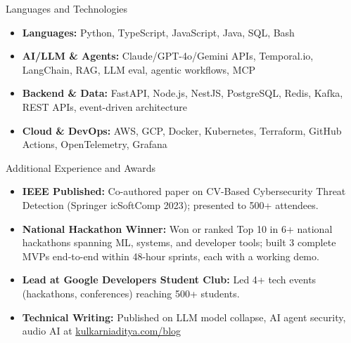\documentclass[]{mcdowellcv}
\begin{document}
\begin{cvsection}{Languages and Technologies}
  \begin{cvsubsection}{}{}{}
    \begin{itemize}
      \item \textbf{Languages:} Python, TypeScript, JavaScript, Java, SQL, Bash
      \item \textbf{AI/LLM \& Agents:} Claude/GPT-4o/Gemini APIs, Temporal.io, LangChain, RAG, LLM eval, agentic workflows, MCP
      \item \textbf{Backend \& Data:} FastAPI, Node.js, NestJS, PostgreSQL, Redis, Kafka, REST APIs, event-driven architecture
      \item \textbf{Cloud \& DevOps:} AWS, GCP, Docker, Kubernetes, Terraform, GitHub Actions, OpenTelemetry, Grafana
    \end{itemize}
  \end{cvsubsection}
\end{cvsection}

\begin{cvsection}{Additional Experience and Awards}
  \begin{cvsubsection}{}{}{}
    \begin{itemize}
      \item \textbf{IEEE Published:} Co-authored paper on CV-Based Cybersecurity Threat Detection (Springer icSoftComp 2023); presented to 500+ attendees.
      \item \textbf{National Hackathon Winner:} Won or ranked Top 10 in 6+ national hackathons spanning ML, systems, and developer tools; built 3 complete MVPs end-to-end within 48-hour sprints, each with a working demo.
      \item \textbf{Lead at Google Developers Student Club:} Led 4+ tech events (hackathons, conferences) reaching 500+ students.
      \item \textbf{Technical Writing:} Published on LLM model collapse, AI agent security, audio AI at \href{https://www.kulkarniaditya.com/blog}{kulkarniaditya.com/blog}
    \end{itemize}
  \end{cvsubsection}
\end{cvsection}
\end{document}
